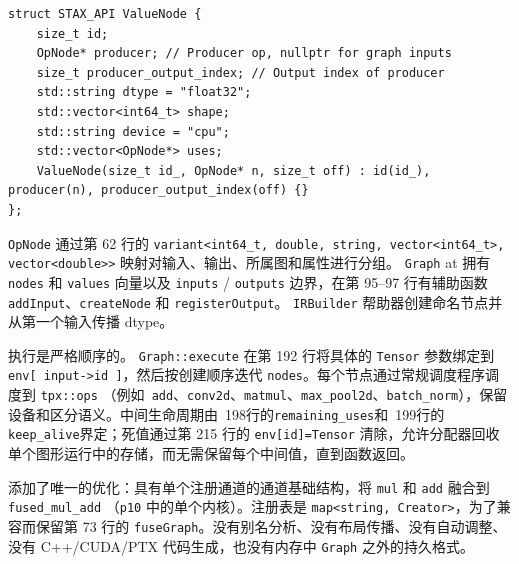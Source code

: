 \begin{lstlisting}[caption={values are slots.}, label=lst:valuenode]
struct STAX_API ValueNode {
    size_t id;
    OpNode* producer; // Producer op, nullptr for graph inputs
    size_t producer_output_index; // Output index of producer
    std::string dtype = "float32";
    std::vector<int64_t> shape;
    std::string device = "cpu";
    std::vector<OpNode*> uses;
    ValueNode(size_t id_, OpNode* n, size_t off) : id(id_), producer(n), producer_output_index(off) {}
};
\end{lstlisting}

\texttt{OpNode} 通过第 62 行的 \texttt{variant<int64\_t, double, string, vector<int64\_t>, vector<double>>} 映射对输入、输出、所属图和属性进行分组。 \texttt{Graph} at 拥有 \texttt{nodes} 和 \texttt{values} 向量以及 \texttt{inputs} / \texttt{outputs} 边界，在第 95--97 行有辅助函数 \texttt{addInput}、\texttt{createNode} 和 \texttt{registerOutput}。 \texttt{IRBuilder} 帮助器创建命名节点并从第一个输入传播 dtype。

执行是严格顺序的。 \texttt{Graph::execute} 在第 192 行将具体的 \texttt{Tensor} 参数绑定到 \texttt{env[ input->id ]}，然后按创建顺序迭代 \texttt{nodes}。每个节点通过常规调度程序调度到 \texttt{tpx::ops} （例如\ \texttt{add}、\texttt{conv2d}、\texttt{matmul}、\texttt{max\_pool2d}、\texttt{batch\_norm}），保留设备和区分语义。中间生命周期由~198行的\texttt{remaining\_uses}和~199行的\texttt{keep\_alive}界定；死值通过第 215 行的 \texttt{env[id]=Tensor} 清除，允许分配器回收单个图形运行中的存储，而无需保留每个中间值，直到函数返回。

添加了唯一的优化：具有单个注册通道的通道基础结构，将 \texttt{mul} 和 \texttt{add} 融合到 \texttt{fused\_mul\_add} （\texttt{p10} 中的单个内核）。注册表是 \texttt{map<string, Creator>}，为了兼容而保留第 73 行的 \texttt{fuseGraph}。没有别名分析、没有布局传播、没有自动调整、没有 C++/CUDA/PTX 代码生成，也没有内存中 \texttt{Graph} 之外的持久格式。

